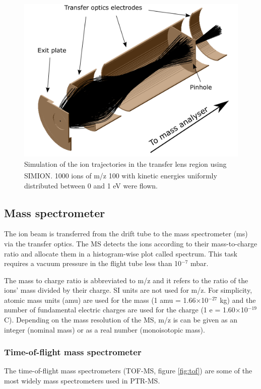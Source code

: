 \begin{figure}%
\centering
\includegraphics[width=0.8\linewidth]{pics/tf_names.png}
\centering
\caption[Simulation of the ion trajectories in the transfer lens region using SIMION\textsuperscript{\textregistered}.]{Simulation of the ion trajectories in the transfer lens region using SIMION\textsuperscript{\textregistered}. 1000 ions of m/z 100 with kinetic energies uniformly distributed between 0 and 1 eV were flown.}
\label{fig:tl_simion}
\end{figure}


\subsection{Mass spectrometer}
The ion beam is transferred from the drift tube to the mass spectrometer (\acrshort{ms}) via the transfer optics. The MS detects the ions according to their mass-to-charge ratio and allocate them in a histogram-wise plot called spectrum. This task requires a vacuum pressure in the flight tube less than 10$^{-7}$ mbar.

The mass to charge ratio is abbreviated to m/z and it refers to the ratio of the ions' mass divided by their charge. SI units are not used for m/z. For simplicity, atomic mass units (\acrshort{amu}) are used for the mass (1 amu = 1.66$\times$10$^{-27}$ kg) and the number of fundamental electric charges are used for the charge (1 e = 1.60$\times$10$^{-19}$ C). Depending on the mass resolution of the MS, m/z is can be given as an integer (nominal mass) or as a real number (monoisotopic mass).  

\subsubsection{Time-of-flight mass spectrometer}
The time-of-flight mass spectrometers  (TOF-MS, figure \ref{fig:tof})  are some of the most widely mass spectrometers used in PTR-MS. 

